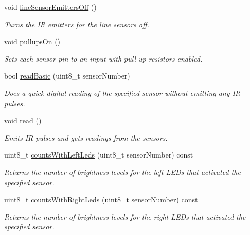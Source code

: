 \begin{DoxyCompactItemize}
void \hyperlink{class_zumo32_u4_proximity_sensors_a583dada6ad676cbda2ec7d55b05338b8}{line\+Sensor\+Emitters\+Off} ()
\begin{DoxyCompactList}\small\item\em Turns the IR emitters for the line sensors off. \end{DoxyCompactList}\item 
\mbox{\label{class_zumo32_u4_proximity_sensors_ae596289faf5921bc7c199cf73edf534e}} 
void \hyperlink{class_zumo32_u4_proximity_sensors_ae596289faf5921bc7c199cf73edf534e}{pullups\+On} ()
\begin{DoxyCompactList}\small\item\em Sets each sensor pin to an input with pull-\/up resistors enabled. \end{DoxyCompactList}\item 
bool \hyperlink{class_zumo32_u4_proximity_sensors_a5c254dc2adf7c47203384241582349d3}{read\+Basic} (uint8\+\_\+t sensor\+Number)
\begin{DoxyCompactList}\small\item\em Does a quick digital reading of the specified sensor without emitting any IR pulses. \end{DoxyCompactList}\item 
void \hyperlink{class_zumo32_u4_proximity_sensors_a071d935e10e2a16a3ae2559d16a12683}{read} ()
\begin{DoxyCompactList}\small\item\em Emits IR pulses and gets readings from the sensors. \end{DoxyCompactList}\item 
uint8\+\_\+t \hyperlink{class_zumo32_u4_proximity_sensors_a734abb888814a97379c349e1deb8897f}{counts\+With\+Left\+Leds} (uint8\+\_\+t sensor\+Number) const
\begin{DoxyCompactList}\small\item\em Returns the number of brightness levels for the left L\+E\+Ds that activated the specified sensor. \end{DoxyCompactList}\item 
uint8\+\_\+t \hyperlink{class_zumo32_u4_proximity_sensors_a2789f740828a81fe3c942998639355ae}{counts\+With\+Right\+Leds} (uint8\+\_\+t sensor\+Number) const
\begin{DoxyCompactList}\small\item\em Returns the number of brightness levels for the right L\+E\+Ds that activated the specified sensor. \end{DoxyCompactList}\item 

\end{DoxyCompactItemize}
